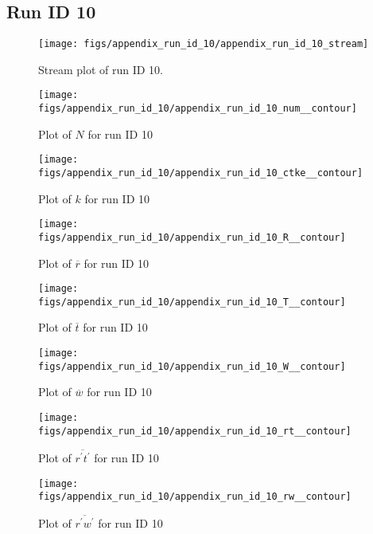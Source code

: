 \subsection{Run ID 10}
\begin{figure}[H]
\centering
\texttt{[image: figs/appendix\_run\_id\_10/appendix\_run\_id\_10\_stream]}
\caption{Stream plot of run ID 10.}
\label{fig:appendix_run_id_10_stream}
\end{figure}


\begin{figure}[H]
\centering
\texttt{[image: figs/appendix\_run\_id\_10/appendix\_run\_id\_10\_num\_\_contour]}
\caption{Plot of $N$ for run ID 10}
\label{fig:appendix_run_id_10_num__contour}
\end{figure}


\begin{figure}[H]
\centering
\texttt{[image: figs/appendix\_run\_id\_10/appendix\_run\_id\_10\_ctke\_\_contour]}
\caption{Plot of $k$ for run ID 10}
\label{fig:appendix_run_id_10_ctke__contour}
\end{figure}


\begin{figure}[H]
\centering
\texttt{[image: figs/appendix\_run\_id\_10/appendix\_run\_id\_10\_R\_\_contour]}
\caption{Plot of $\overline{r}$ for run ID 10}
\label{fig:appendix_run_id_10_R__contour}
\end{figure}


\begin{figure}[H]
\centering
\texttt{[image: figs/appendix\_run\_id\_10/appendix\_run\_id\_10\_T\_\_contour]}
\caption{Plot of $\overline{t}$ for run ID 10}
\label{fig:appendix_run_id_10_T__contour}
\end{figure}


\begin{figure}[H]
\centering
\texttt{[image: figs/appendix\_run\_id\_10/appendix\_run\_id\_10\_W\_\_contour]}
\caption{Plot of $\overline{w}$ for run ID 10}
\label{fig:appendix_run_id_10_W__contour}
\end{figure}


\begin{figure}[H]
\centering
\texttt{[image: figs/appendix\_run\_id\_10/appendix\_run\_id\_10\_rt\_\_contour]}
\caption{Plot of $\overline{r^\prime t^\prime}$ for run ID 10}
\label{fig:appendix_run_id_10_rt__contour}
\end{figure}


\begin{figure}[H]
\centering
\texttt{[image: figs/appendix\_run\_id\_10/appendix\_run\_id\_10\_rw\_\_contour]}
\caption{Plot of $\overline{r^\prime w^\prime}$ for run ID 10}
\label{fig:appendix_run_id_10_rw__contour}
\end{figure}


